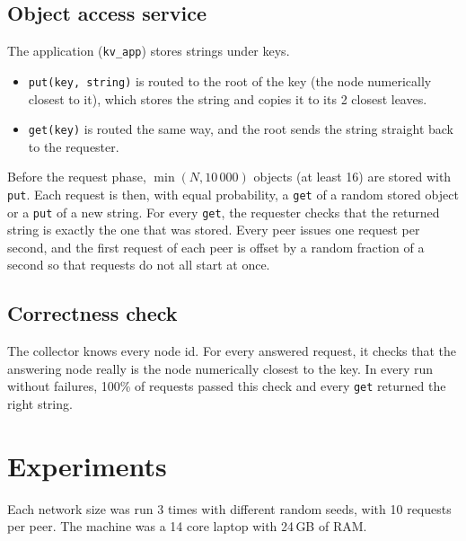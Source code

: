 \documentclass[10pt]{article}
\begin{document}
\subsection{Object access service}
The application (\texttt{kv\_app}) stores strings under keys.
\begin{itemize}
  \item \texttt{put(key, string)} is routed to the root of the key (the node numerically closest to it), which stores the string and copies it to its 2 closest leaves.
  \item \texttt{get(key)} is routed the same way, and the root sends the string straight back to the requester.
\end{itemize}
Before the request phase, $\min(N, 10\,000)$ objects (at least 16) are stored with \texttt{put}.
Each request is then, with equal probability, a \texttt{get} of a random stored object or a \texttt{put} of a new string.
For every \texttt{get}, the requester checks that the returned string is exactly the one that was stored.
Every peer issues one request per second, and the first request of each peer is offset by a random fraction of a second so that requests do not all start at once.

\subsection{Correctness check}
The collector knows every node id.
For every answered request, it checks that the answering node really is the node numerically closest to the key.
In every run without failures, 100\% of requests passed this check and every \texttt{get} returned the right string.

\section{Experiments}
Each network size was run 3 times with different random seeds, with 10 requests per peer.
The machine was a 14 core laptop with 24\,GB of RAM.
\end{document}
